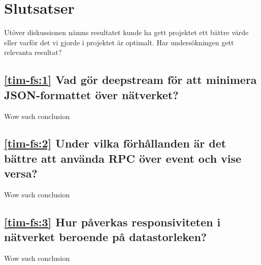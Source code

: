 \section{Slutsatser}
\label{sec:tim-conclusion}
Utöver diskussionen nämns resultatet kunde ha gett projektet ett bättre värde eller varför det vi gjorde i projektet är optimalt. Har undersökningen gett relevanta resultat?

\subsection*{\ref{tim-fs:1} Vad gör deepstream för att minimera JSON-formattet över nätverket?}
Wow such conclusion

\subsection*{\ref{tim-fs:2} Under vilka förhållanden är det bättre att använda RPC över event och vise versa?}
Wow such conclusion

\subsection*{\ref{tim-fs:3} Hur påverkas responsiviteten i nätverket beroende på datastorleken?}
Wow such conclusion
